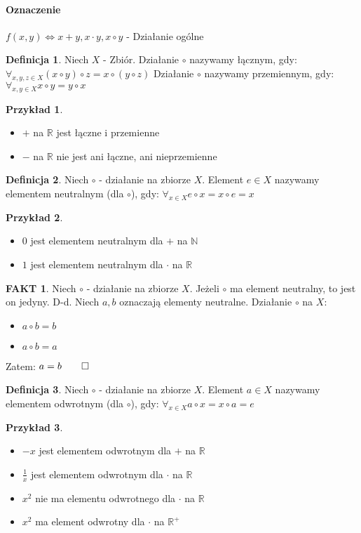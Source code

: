 \documentclass{article}
\theoremstyle{definition}
\newtheorem{de}{Definicja}[subsection]
\theoremstyle{definition}
\theoremstyle{definition}
\newtheorem{pk}{Przykład}[subsection]
\theoremstyle{definition}
\newtheorem*{fakt}{FAKT}
\begin{document}
\paragraph{Oznaczenie}

$f(x,y)\iff x+y, x\cdot y, x\circ y$ - Działanie ogólne

\begin{de}
Niech $X$ - Zbiór. Działanie $\circ$ nazywamy łącznym, gdy:
$\forall_{x,y,z\in X} (x\circ y)\circ z = x\circ (y\circ z)$
Działanie $\circ$ nazywamy przemiennym, gdy:
$\forall_{x,y\in X} x\circ y = y\circ x$
\end{de}

\begin{pk}
\begin{itemize}
.
\item $+$ na $\mathbb{R}$ jest łączne i przemienne
\item $-$ na $\mathbb{R}$ nie jest ani łączne, ani nieprzemienne
\end{itemize}
\end{pk}

\begin{de}
Niech $\circ$ - działanie na zbiorze $X$. Element $e\in X$ nazywamy elementem neutralnym (dla $\circ$), gdy:
$\forall_{x\in X} e\circ x = x\circ e = x$
\end{de}

\begin{pk}
\begin{itemize}
.
\item $0$ jest elementem neutralnym dla $+$ na $\mathbb{N}$
\item $1$ jest elementem neutralnym dla $\cdot$ na $\mathbb{R}$
\end{itemize}
\end{pk}

\begin{fakt}
Niech $\circ$ - działanie na zbiorze $X$. Jeżeli $\circ$ ma element neutralny, to jest on jedyny.
D-d. Niech $a,b$ oznaczają elementy neutralne. Działanie $\circ$ na $X$:
\begin{itemize}
\item $a\circ b = b$
\item $a\circ b = a$
\end{itemize}
Zatem: $a=b\qed$
\end{fakt}

\begin{de}
Niech $\circ$ - działanie na zbiorze $X$. Element $a\in X$ nazywamy elementem odwrotnym (dla $\circ$), gdy:
$\forall_{x\in X} a\circ x = x\circ a = e$
\end{de}

\begin{pk}
\begin{itemize}
.
\item $-x$ jest elementem odwrotnym dla $+$ na $\mathbb{R}$
\item $\frac{1}{x}$ jest elementem odwrotnym dla $\cdot$ na $\mathbb{R}$
\item $x^2$ nie ma elementu odwrotnego dla $\cdot$ na $\mathbb{R}$
\item $x^2$ ma element odwrotny dla $\cdot$ na $\mathbb{R}^+$
\end{itemize}
\end{pk}
\end{document}
